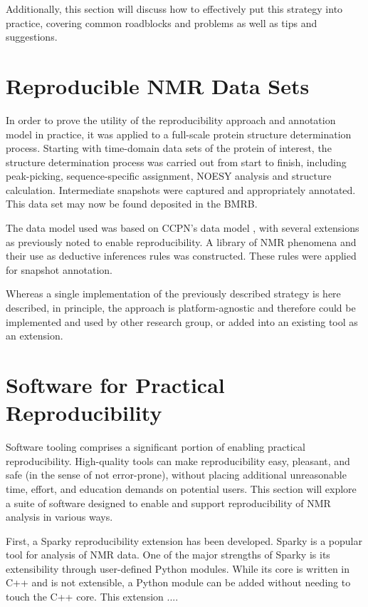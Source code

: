 \documentclass[a4paper]{report}
\begin{document}
Additionally, this section will discuss how to effectively put this strategy 
into practice, covering common roadblocks and problems as well as tips and 
suggestions.


\section{Reproducible NMR Data Sets}
In order to prove the utility of the reproducibility approach and annotation 
model in practice, it was applied to a full-scale protein structure 
determination process.  Starting with time-domain data sets of the protein of 
interest, the structure determination process was carried out from start to 
finish, including peak-picking, sequence-specific assignment, NOESY analysis 
and structure calculation.  Intermediate snapshots were captured and 
appropriately annotated.  This data set may now be found deposited in the BMRB.

The data model used was based on CCPN’s data model \cite{ccpn}, with several 
extensions as previously noted to enable reproducibility.  A library of NMR 
phenomena and their use as deductive inferences rules was constructed.  
These rules were applied for snapshot annotation.

Whereas a single implementation of the previously described strategy is 
here described, in principle, the approach is platform-agnostic and 
therefore could be implemented and used by other research group, or added 
into an existing tool as an extension.


\section{Software for Practical Reproducibility}
Software tooling comprises a significant portion of enabling practical 
reproducibility.  High-quality tools can make reproducibility easy, pleasant, 
and safe (in the sense of not error-prone), without placing additional 
unreasonable time, effort, and education demands on potential users.  This 
section will explore a suite of software designed to enable and support 
reproducibility of NMR analysis in various ways.
	
First, a Sparky reproducibility extension has been developed.  Sparky 
\cite{sparky} is a popular tool for analysis of NMR data.  One of the major 
strengths of Sparky is its extensibility through user-defined Python modules.  
While its core is written in C++ and is not extensible, a Python module can 
be added without needing to touch the C++ core.  This extension .... %
\end{document}
